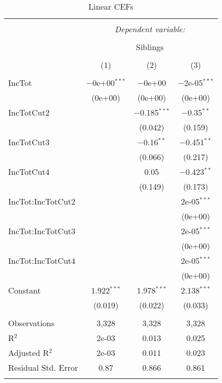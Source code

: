 
\begin{table}[!htbp] \centering 
  \caption{Linear CEFs} 
  \label{} 
\begin{tabular}{@{\extracolsep{5pt}}lccc} 
\\[-1.8ex]\hline 
\hline \\[-1.8ex] 
 & \multicolumn{3}{c}{\textit{Dependent variable:}} \\ 
\cline{2-4} 
\\[-1.8ex] & \multicolumn{3}{c}{Siblings} \\ 
\\[-1.8ex] & (1) & (2) & (3)\\ 
\hline \\[-1.8ex] 
 IncTot & $-$0e+00$^{***}$ & $-$0e+00 & $-$2e-05$^{***}$ \\ 
  & (0e+00) & (0e+00) & (0e+00) \\ 
  IncTotCut2 &  & $-$0.185$^{***}$ & $-$0.35$^{**}$ \\ 
  &  & (0.042) & (0.159) \\ 
  IncTotCut3 &  & $-$0.16$^{**}$ & $-$0.451$^{**}$ \\ 
  &  & (0.066) & (0.217) \\ 
  IncTotCut4 &  & 0.05 & $-$0.423$^{**}$ \\ 
  &  & (0.149) & (0.173) \\ 
  IncTot:IncTotCut2 &  &  & 2e-05$^{***}$ \\ 
  &  &  & (0e+00) \\ 
  IncTot:IncTotCut3 &  &  & 2e-05$^{***}$ \\ 
  &  &  & (0e+00) \\ 
  IncTot:IncTotCut4 &  &  & 2e-05$^{***}$ \\ 
  &  &  & (0e+00) \\ 
  Constant & 1.922$^{***}$ & 1.978$^{***}$ & 2.138$^{***}$ \\ 
  & (0.019) & (0.022) & (0.033) \\ 
 \hline \\[-1.8ex] 
Observations & 3,328 & 3,328 & 3,328 \\ 
R$^{2}$ & 2e-03 & 0.013 & 0.025 \\ 
Adjusted R$^{2}$ & 2e-03 & 0.011 & 0.023 \\ 
Residual Std. Error & 0.87 & 0.866 & 0.861 \\ 
\hline 
\hline \\[-1.8ex] 
\end{tabular} 
\end{table} 
